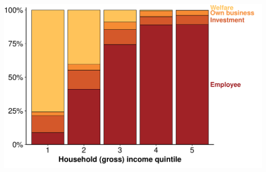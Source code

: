 \documentclass[a4paper,landscape]{article}\usepackage[]{graphicx}\usepackage[]{color}
\newenvironment{knitrout}{}{} %
\begin{document}
\begin{knitrout}
\color{fgcolor}
\includegraphics[width=11.000in,height=7.00in]{figure/GST-Figure-5-1} 

\end{knitrout}
\end{document}
